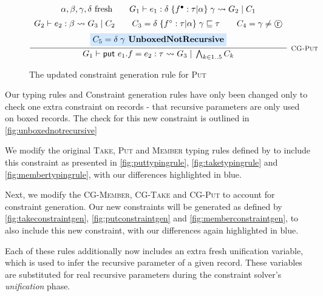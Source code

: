 \begin{figure}
    \centering
    \[
        \infer[\textsc{\footnotesize{CG-Put}}]{
            G_1 \vdash \textsf{put } e_1.f = e_2 : \tau \rightsquigarrow G_3\; 
                |\; \bigwedge_{k \in 1..5} C_k
        }{
            \begin{array}{c}
                \alpha, \beta, \gamma, \delta \text{ fresh}
                \hspace{2em}
                G_1 \vdash e_1 : \delta\; \{ f^\bullet: \tau | \alpha \}\; 
                    \gamma \rightsquigarrow G_2\; |\; C_1 \\[5pt]
                G_2 \vdash e_2 : \beta \rightsquigarrow G_3\; |\; C_2
                \hspace{2em}
                C_3 =  \delta\; \{ f^\circ : \tau | \alpha \}\; 
                    \gamma \subtype \tau
                \hspace{2em}
                C_4 = \gamma \neq \text{\textcircled{r}} \\[5pt]
                \colorbox{highlighteq}{$C_5 = \delta\; \gamma \textbf{ UnboxedNotRecursive}$}
            \end{array}
        }
    \]
    
    \caption{The updated constraint generation rule for \textsc{Put}}
    \label{fig:putconstraintgen}
\end{figure}

Our typing rules and Constraint generation rules have only been changed only to check one extra
constraint on records - that recursive parameters are only used on boxed records. The check for this
new constraint is outlined in \autoref{fig:unboxednotrecursive}

We modify the original \textsc{Take}, \textsc{Put} and \textsc{Member} typing rules defined by
\citet{LiamThesis} to include this constraint as presented in \autoref{fig:puttypingrule},
\autoref{fig:taketypingrule} and \autoref{fig:membertypingrule}, with our differences
highlighted in \colorbox{highlighteq}{blue}.

Next, we modify the \textsc{CG-Member}, \textsc{CG-Take} and \textsc{CG-Put} to account
for constraint generation. Our new constraints will be generated
as defined by \autoref{fig:takeconstraintgen}, \autoref{fig:putconstraintgen} and 
\autoref{fig:memberconstraintgen}, to also include this new constraint, with our differences
again highlighted in \colorbox{highlighteq}{blue}.

Each of these rules additionally now includes an extra fresh unification variable, which is
used to infer the recursive parameter of a given record. These variables are substituted
for real recursive parameters during the constraint solver's \textit{unification} phase.

